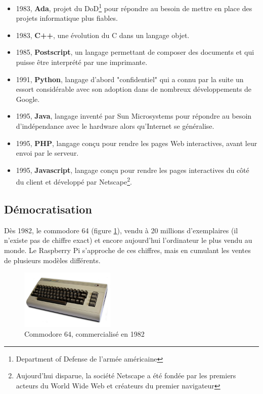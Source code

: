 \documentclass[a4paper,11pt]{book}
\begin{document}
\begin{itemize}
    \item 1983, \textbf{Ada}, projet du DoD\footnote{Department of Defense de l'armée américaine} pour répondre au besoin de mettre en place des projets informatique plus fiables.
    \item 1983, \textbf{C++}, une évolution du C dans un langage objet.
    \item 1985, \textbf{Postscript}, un langage permettant de composer des documents et qui puisse être interprété par une imprimante.
    \item 1991, \textbf{Python}, langage d'abord "confidentiel" qui a connu par la suite un essort considérable avec son adoption dans de nombreux développements de Google.
    \item 1995, \textbf{Java}, langage inventé par Sun Microsystems pour répondre au besoin d'indépendance avec le hardware alors qu'Internet se généralise.
    \item 1995, \textbf{PHP}, langage conçu pour rendre les pages Web interactives, avant leur envoi par le serveur.
    \item 1995, \textbf{Javascript}, langage conçu pour rendre les pages interactives du côté du client et développé par Netscape\footnote{Aujourd'hui disparue, la société Netscape a été fondée par les premiers acteurs du World Wide Web et créateurs du premier navigateur}.
\end{itemize}

\subsection{Démocratisation}
Dès 1982, le commodore 64 (figure \ref{commodore64}), vendu à 20 millions d'exemplaires (il n'existe pas de chiffre exact) et encore aujourd'hui l'ordinateur le plus vendu au monde. Le Raspberry Pi s'approche de ces chiffres, mais en cumulant les ventes de plusieurs modèles différents.

\begin{figure}[h]
    \centering
    \includegraphics[width=0.4\textwidth]{media/machines/Commodore64.jpeg}
    \caption{Commodore 64, commercialisé en 1982}
    \label{commodore64}
\end{figure}
\end{document}
